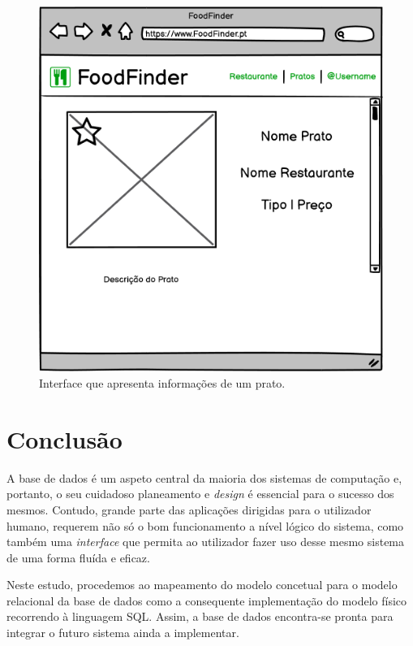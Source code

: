 \documentclass[a4paper,12pt]{report}
\begin{document}
	\begin{figure}[H]
	\begin{center}
	\includegraphics[scale=0.60]{Screen_Prato}	
	\end{center}
	\caption{Interface que apresenta informações de um prato.}
	\label{fig:Screen_Prato}	
	\end{figure} 


	

\chapter{Conclusão}	

	A base de dados é um aspeto central da maioria dos sistemas de computação e, portanto, o seu cuidadoso planeamento e \textit{design} é essencial para o sucesso dos mesmos. Contudo, grande parte das aplicações dirigidas para o utilizador humano, requerem não só o bom funcionamento a nível lógico do sistema, como também uma \textit{interface} que permita ao utilizador fazer uso desse mesmo sistema de uma forma fluída e eficaz.  
	
	Neste estudo, procedemos ao mapeamento do modelo concetual para o modelo relacional da base de dados como a consequente implementação do modelo físico recorrendo à linguagem SQL. Assim, a base de dados encontra-se pronta para integrar o futuro sistema ainda a implementar.
	
\end{document}
